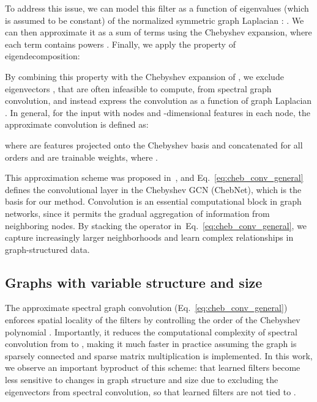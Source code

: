 \documentclass[final,nonatbib]{article} \usepackage{nips_2018}
\begin{document}
	To address this issue, we can model this filter as a function of eigenvalues  (which is assumed to be constant) of the normalized symmetric graph Laplacian : . We can then approximate it as a sum of  terms using the Chebyshev expansion, where each term  contains powers . Finally, we apply the property of eigendecomposition:
	
	By combining this property with the Chebyshev expansion of , we exclude eigenvectors , that are often infeasible to compute, from spectral graph convolution, and instead express the convolution as a function of graph Laplacian .
	In general, for the input  with  nodes and -dimensional features in each node, the approximate convolution is defined as:

where  are features projected onto the Chebyshev basis  and concatenated for all orders  and  are trainable weights, where .

	This approximation scheme was proposed in~\cite{defferrard2016convolutional}, and Eq.~\ref{eq:cheb_conv_general} defines the convolutional layer in the Chebyshev GCN (ChebNet), which is the basis for our method. Convolution is an essential computational block in graph networks, since it permits the gradual aggregation of information from neighboring nodes. By stacking the operator in~Eq.~\ref{eq:cheb_conv_general}, we capture increasingly larger neighborhoods and learn complex relationships in graph-structured data.
\subsection{Graphs with variable structure and size}
	\label{sec:graph_structure_size}
The approximate spectral graph convolution (Eq.~\ref{eq:cheb_conv_general}) enforces spatial locality of the filters by controlling the order of the Chebyshev polynomial . Importantly, it reduces the computational complexity of spectral convolution from  to , making it much faster in practice assuming the graph is sparsely connected and sparse matrix multiplication is implemented.
	In this work, we observe an important byproduct of this scheme: that learned filters become less sensitive to changes in graph structure and size due to excluding the eigenvectors  from spectral convolution, so that learned filters are not tied to .
\end{document}
